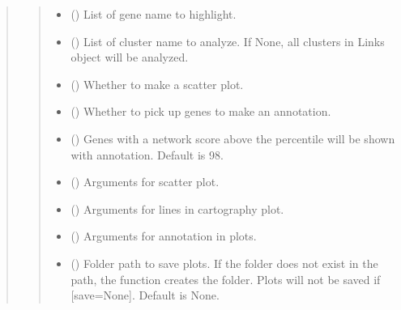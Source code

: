 \documentclass[letterpaper,10pt,english]{sphinxmanual}
\begin{document}
\begin{quote}
\begin{fulllineitems}
\begin{fulllineitems}
\begin{quote}
\begin{description}
\begin{itemize}
\item {} 
 () \textendash{} List of gene name to highlight.

\item {} 
 () \textendash{} List of cluster name to analyze. If None, all clusters in Links object will be analyzed.

\item {} 
 () \textendash{} Whether to make a scatter plot.

\item {} 
 () \textendash{} Whether to pick up genes to make an annotation.

\item {} 
 () \textendash{} Genes with a network score above the percentile will be shown with annotation. Default is 98.

\item {} 
 () \textendash{} Arguments for scatter plot.

\item {} 
 () \textendash{} Arguments for lines in cartography plot.

\item {} 
 () \textendash{} Arguments for annotation in plots.

\item {} 
 () \textendash{} Folder path to save plots. If the folder does not exist in the path, the function creates the folder.
Plots will not be saved if {[}save=None{]}. Default is None.

\end{itemize}

\end{description}\end{quote}


\end{fulllineitems}
\end{fulllineitems}
\end{quote}
\end{document}

